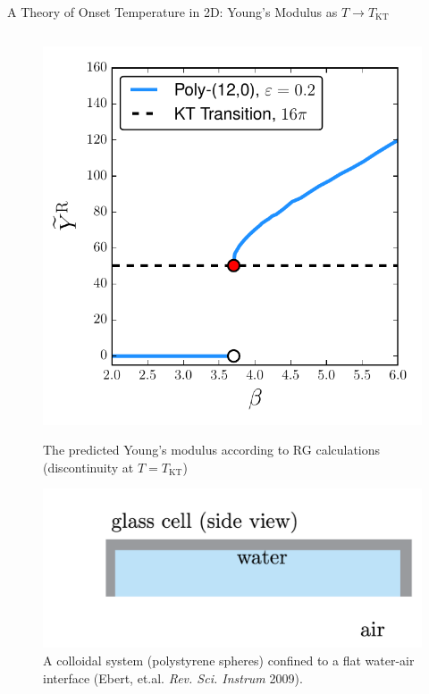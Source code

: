 

\begin{frame}{A Theory of Onset Temperature in 2D: Young's Modulus as $T \to T_\mathrm{KT}$}


\begin{columns}

\begin{column}[T]{0.425\textwidth}

\begin{figure}
    \begin{overprint}
    \centering\includegraphics[height=0.65\textheight]{c.13-kt_keim_1/Yrenorm_poly12.pdf}\caption{The predicted Young's modulus according to RG calculations (discontinuity at $T=T_\mathrm{KT}$)}

\vspace{15pt}\centering\includegraphics[width=\linewidth]{c.13-kt_keim_1/keim_setup_0.pdf}\caption{A colloidal system (polystyrene spheres) confined to a flat water-air interface (Ebert, et.al. \textit{Rev. Sci. Instrum} 2009).}


\end{overprint}
\end{figure}
\end{column}
\end{columns}
\end{frame}
